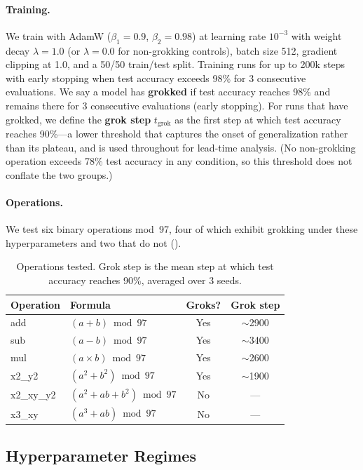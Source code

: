 \documentclass[11pt]{article}
\begin{document}
\paragraph{Training.}
We train with AdamW ($\beta_1 = 0.9$, $\beta_2 = 0.98$) at learning rate $10^{-3}$ with weight decay $\lambda = 1.0$ (or $\lambda = 0.0$ for non-grokking controls), batch size 512, gradient clipping at 1.0, and a 50/50 train/test split.
Training runs for up to 200k steps with early stopping when test accuracy exceeds 98\% for 3 consecutive evaluations.
We say a model has \textbf{grokked} if test accuracy reaches 98\% and remains there for 3 consecutive evaluations (early stopping).
For runs that have grokked, we define the \textbf{grok step} $t_\text{grok}$ as the first step at which test accuracy reaches 90\%---a lower threshold that captures the onset of generalization rather than its plateau, and is used throughout for lead-time analysis.
(No non-grokking operation exceeds 78\% test accuracy in any condition, so this threshold does not conflate the two groups.)

\paragraph{Operations.}
We test six binary operations mod~97, four of which exhibit grokking under these hyperparameters and two that do not ().

\begin{table}[ht]
\centering
\caption{Operations tested. Grok step is the mean step at which test accuracy reaches 90\%, averaged over 3 seeds.}
\label{tab:operations}
\begin{tabular}{@{}llcc@{}}
\toprule
Operation & Formula & Groks? & Grok step \\
\midrule
add & $(a+b) \bmod 97$ & Yes & $\sim$2900 \\
sub & $(a-b) \bmod 97$ & Yes & $\sim$3400 \\
mul & $(a \times b) \bmod 97$ & Yes & $\sim$2600 \\
x2\_y2 & $(a^2+b^2) \bmod 97$ & Yes & $\sim$1900 \\
x2\_xy\_y2 & $(a^2+ab+b^2) \bmod 97$ & No & --- \\
x3\_xy & $(a^3+ab) \bmod 97$ & No & --- \\
\bottomrule
\end{tabular}
\end{table}

\subsection{Hyperparameter Regimes}
\end{document}
